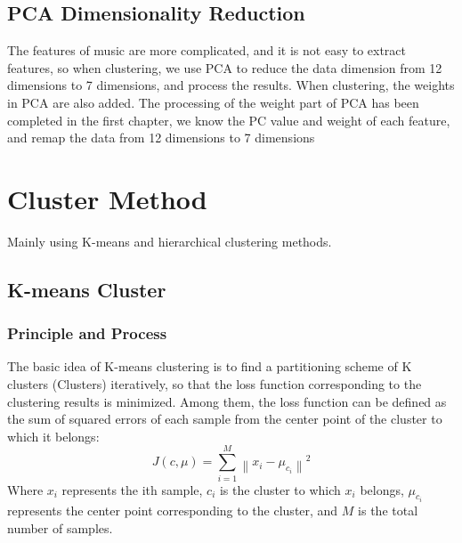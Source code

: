 \subsection{PCA Dimensionality Reduction}
The features of music are more complicated, and it is not easy to extract features, so when clustering, we use PCA to reduce the data dimension from 12 dimensions to 7 dimensions, and process the results. When clustering, the weights in PCA are also added. The processing of the weight part of PCA has been completed in the first chapter, we know the PC value and weight of each feature, and remap the data from 12 dimensions to 7 dimensions



\section{Cluster Method}
Mainly using K-means and hierarchical clustering methods.
\subsection{K-means Cluster}
\subsubsection{Principle and Process}
The basic idea of K-means clustering is to find a partitioning scheme of K clusters (Clusters) iteratively, so that the loss function corresponding to the clustering results is minimized. Among them, the loss function can be defined as the sum of squared errors of each sample from the center point of the cluster to which it belongs:
\begin{equation}
    J(c, \mu)=\sum_{i=1}^{M}\left\|x_{i}-\mu_{c_{i}}\right\|^{2}
\end{equation}
Where $x_i$ represents the ith sample, $c_i$ is the cluster to which $x_i$ belongs, $\mu_{c_i}$ represents the center point corresponding to the cluster, and $M$ is the total number of samples.

